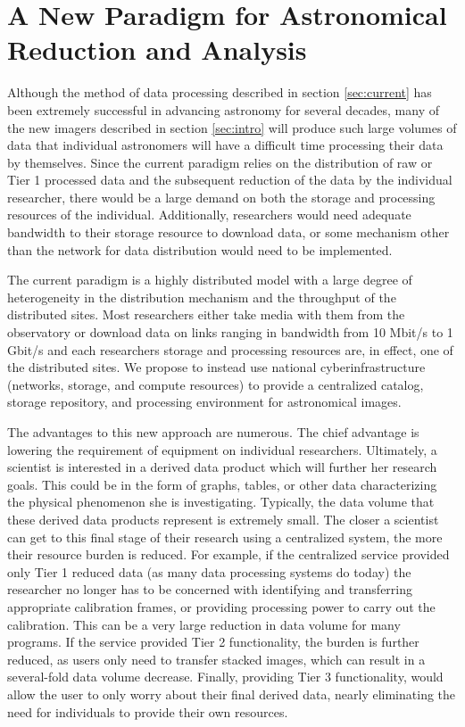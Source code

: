 \documentclass[10pt,conference]{IEEEtran}
\begin{document}
\section{A New Paradigm for Astronomical Reduction and Analysis}\label{sec:rev}

Although the method of data processing described in section \ref{sec:current} has been extremely successful in advancing astronomy for several decades, many of the new imagers described in section \ref{sec:intro} will produce such large volumes of data that individual astronomers will have a difficult time processing their data by themselves. Since the current paradigm relies on the distribution of raw or Tier 1 processed data and the subsequent reduction of the data by the individual researcher, there would be a large demand on both the storage and processing resources of the individual. Additionally, researchers would need adequate bandwidth to their storage resource to download data, or some mechanism other than the network for data distribution would need to be implemented. 

The current paradigm is a highly distributed model with a large degree of heterogeneity in the distribution mechanism and the throughput of the distributed sites. Most researchers either take media with them from the observatory or download data on links ranging in bandwidth from 10 Mbit/s to 1 Gbit/s and each researchers storage and processing resources are, in effect, one of the distributed sites. We propose to instead use national cyberinfrastructure (networks, storage, and compute resources) to provide a centralized catalog, storage repository, and processing environment for astronomical images. 

The advantages to this new approach are numerous. The chief advantage is lowering the requirement of equipment on individual researchers. Ultimately, a scientist is interested in a derived data product which will further her research goals. This could be in the form of graphs, tables, or other data characterizing the physical phenomenon she is investigating. Typically, the data volume that these derived data products represent is extremely small. The closer a scientist can get to this final stage of their research using a centralized system, the more their resource burden is reduced. For example, if the centralized service provided only Tier 1 reduced data (as many data processing systems do today) the researcher no longer has to be concerned with identifying and transferring appropriate calibration frames, or providing processing power to carry out the calibration. This can be a very large reduction in data volume for many programs. If the service provided Tier 2 functionality, the burden is further reduced, as users only need to transfer stacked images, which can result in a several-fold data volume decrease. Finally, providing Tier 3 functionality, would allow the user to only worry about their final derived data, nearly eliminating the need for individuals to provide their own resources. 
\end{document}
